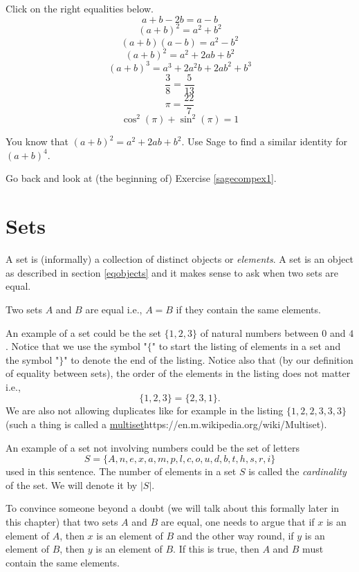 \documentclass{article}
\begin{document}
\begin{quiz}
\question
Click on the right equalities below.
$$a + b - 2 b = a - b$$
$$(a+b)^2 = a^2 + b^2$$
$$(a + b)(a - b) = a^2 - b^2$$
$$(a + b)^2 = a^2 + 2 a b +  b^2$$
$$(a+b)^3 = a^3 + 2 a^2 b + 2 a b^2 + b^3$$
$$\frac{3}{8} = \frac{5}{13}$$ 
$$
\pi = \frac{22}{7}
$$
$$
\cos^2(\pi) + \sin^2(\pi) = 1
$$
\end{quiz}
\endshex

\beginshex
You know that $(a+ b)^2 = a^2 + 2 a b + b^2$. Use Sage to find a similar identity
for $(a + b)^4$.

\begin{hint}[showhide]
  Go back and look at (the beginning of) Exercise \ref{sagecompex1}.
\end{hint}
\endshex



\section{Sets}

A set is (informally) a collection of distinct objects or \emph{elements}. A set
is an object as described in section \ref{eqobjects} and it makes sense to
ask when two sets are equal.

\begin{definition}[emph]
Two sets $A$ and $B$ are equal i.e., $A = B$ if they contain the same elements.
\end{definition}

An example of a set could be 
the set $\{1,2,3\}$ of natural numbers between $0$ and $4$. Notice that we use the symbol
"$\{$" to start the listing of elements in a set and the symbol "$\}$" to denote the end of the listing.
Notice also that (by our definition of equality between sets), the order of the elements in the listing does not matter i.e.,
$$
\{1, 2, 3\} = \{2, 3, 1\}.
$$
We are also not allowing duplicates like for
example in the listing $\{1, 2, 2, 3, 3, 3\}$ (such a thing is called a \url{multiset}{https://en.m.wikipedia.org/wiki/Multiset}).

An example of a set not involving numbers could be the set of letters 
$$
S=\{A, n, e, x, a, m, p, l, c, o, u, d, b, t, h, s, r, i\}
$$ 
used in this sentence. The number of elements in a set $S$ is called the \emph{cardinality} of the set.
We will denote it by $|S|$.

To convince someone beyond a doubt (we will talk about this formally later in this chapter) that two sets $A$ and $B$ are equal, one needs to argue that if $x$ is an element of $A$, then $x$ is an element of $B$ and the other way round, if $y$ is an element of $B$, then $y$ is an element of $B$. If this is true, then
$A$ and $B$ must contain the same elements.
\end{document}
